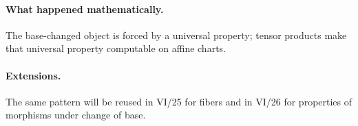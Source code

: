 \paragraph{What happened mathematically.}
The base-changed object is forced by a universal property; tensor products make that universal property computable on affine charts.

\paragraph{Extensions.}
The same pattern will be reused in VI/25 for fibers and in VI/26 for properties of morphisms under change of base.
\fi
